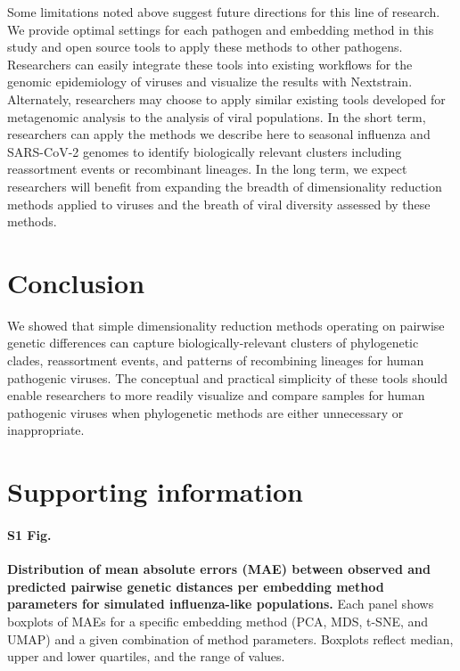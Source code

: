 \documentclass[10pt,letterpaper]{article}
\begin{document}
Some limitations noted above suggest future directions for this line of research.
We provide optimal settings for each pathogen and embedding method in this study and open source tools to apply these methods to other pathogens.
Researchers can easily integrate these tools into existing workflows for the genomic epidemiology of viruses and visualize the results with Nextstrain.
Alternately, researchers may choose to apply similar existing tools developed for metagenomic analysis \cite{Schloss2009,Schloss2020,Bolyen2019,McMurdie2013} to the analysis of viral populations.
In the short term, researchers can apply the methods we describe here to seasonal influenza and SARS-CoV-2 genomes to identify biologically relevant clusters including reassortment events or recombinant lineages.
In the long term, we expect researchers will benefit from expanding the breadth of dimensionality reduction methods applied to viruses and the breath of viral diversity assessed by these methods.

\section*{Conclusion}

We showed that simple dimensionality reduction methods operating on pairwise genetic differences can capture biologically-relevant clusters of phylogenetic clades, reassortment events, and patterns of recombining lineages for human pathogenic viruses.
The conceptual and practical simplicity of these tools should enable researchers to more readily visualize and compare samples for human pathogenic viruses when phylogenetic methods are either unnecessary or inappropriate.

\section*{Supporting information}

\paragraph*{S1 Fig.}
\label{S1_Fig_simulated_flu_errors}
{\bf Distribution of mean absolute errors (MAE) between observed and predicted pairwise genetic distances per embedding method parameters for simulated influenza-like populations.} Each panel shows boxplots of MAEs for a specific embedding method (PCA, MDS, t-SNE, and UMAP) and a given combination of method parameters. Boxplots reflect median, upper and lower quartiles, and the range of values.
\end{document}
